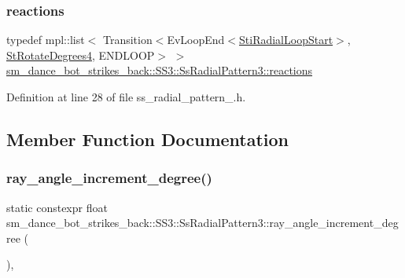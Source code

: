 \subsubsection{\texorpdfstring{reactions}{reactions}}
{\footnotesize\ttfamily typedef mpl\+::list$<$ Transition$<$Ev\+Loop\+End$<$\hyperlink{structsm__dance__bot__strikes__back_1_1radial__motion__states_1_1StiRadialLoopStart}{Sti\+Radial\+Loop\+Start}$>$, \hyperlink{structsm__dance__bot__strikes__back_1_1StRotateDegrees4}{St\+Rotate\+Degrees4}, E\+N\+D\+L\+O\+OP$>$ $>$ \hyperlink{structsm__dance__bot__strikes__back_1_1SS3_1_1SsRadialPattern3_a60083a930035dd05be3e82d8fe8fb7d1}{sm\+\_\+dance\+\_\+bot\+\_\+strikes\+\_\+back\+::\+S\+S3\+::\+Ss\+Radial\+Pattern3\+::reactions}}



Definition at line 28 of file ss\+\_\+radial\+\_\+pattern\+\_.\+h.



\subsection{Member Function Documentation}
\mbox{\label{structsm__dance__bot__strikes__back_1_1SS3_1_1SsRadialPattern3_ac6a4333191cc9dfdb599ae9b24b35cbe}} 
\subsubsection{\texorpdfstring{ray\+\_\+angle\+\_\+increment\+\_\+degree()}{ray\_angle\_increment\_degree()}}
{\footnotesize\ttfamily static constexpr float sm\+\_\+dance\+\_\+bot\+\_\+strikes\+\_\+back\+::\+S\+S3\+::\+Ss\+Radial\+Pattern3\+::ray\+\_\+angle\+\_\+increment\+\_\+degree (\begin{DoxyParamCaption}{ }\end{DoxyParamCaption})\hspace{0.3cm}{\ttfamily [inline]}, {\ttfamily [static]}}



